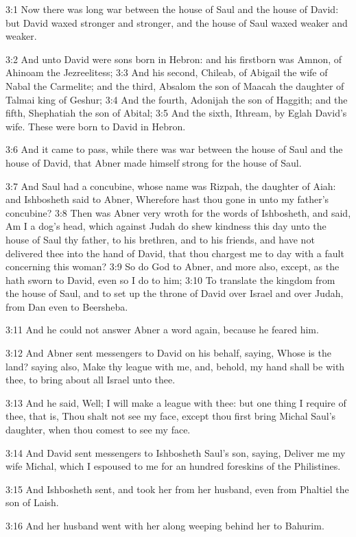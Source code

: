 3:1 Now there was long war between the house of Saul and the house of
David: but David waxed stronger and stronger, and the house of Saul
waxed weaker and weaker.

3:2 And unto David were sons born in Hebron: and his firstborn was
Amnon, of Ahinoam the Jezreelitess; 3:3 And his second, Chileab, of
Abigail the wife of Nabal the Carmelite; and the third, Absalom the
son of Maacah the daughter of Talmai king of Geshur; 3:4 And the
fourth, Adonijah the son of Haggith; and the fifth, Shephatiah the son
of Abital; 3:5 And the sixth, Ithream, by Eglah David's wife. These
were born to David in Hebron.

3:6 And it came to pass, while there was war between the house of Saul
and the house of David, that Abner made himself strong for the house
of Saul.

3:7 And Saul had a concubine, whose name was Rizpah, the daughter of
Aiah: and Ishbosheth said to Abner, Wherefore hast thou gone in unto
my father's concubine?  3:8 Then was Abner very wroth for the words of
Ishbosheth, and said, Am I a dog's head, which against Judah do shew
kindness this day unto the house of Saul thy father, to his brethren,
and to his friends, and have not delivered thee into the hand of
David, that thou chargest me to day with a fault concerning this
woman?  3:9 So do God to Abner, and more also, except, as the \LORD
hath sworn to David, even so I do to him; 3:10 To translate the
kingdom from the house of Saul, and to set up the throne of David over
Israel and over Judah, from Dan even to Beersheba.

3:11 And he could not answer Abner a word again, because he feared
him.

3:12 And Abner sent messengers to David on his behalf, saying, Whose
is the land? saying also, Make thy league with me, and, behold, my
hand shall be with thee, to bring about all Israel unto thee.

3:13 And he said, Well; I will make a league with thee: but one thing
I require of thee, that is, Thou shalt not see my face, except thou
first bring Michal Saul's daughter, when thou comest to see my face.

3:14 And David sent messengers to Ishbosheth Saul's son, saying,
Deliver me my wife Michal, which I espoused to me for an hundred
foreskins of the Philistines.

3:15 And Ishbosheth sent, and took her from her husband, even from
Phaltiel the son of Laish.

3:16 And her husband went with her along weeping behind her to
Bahurim.

